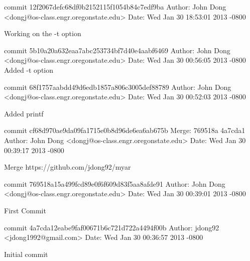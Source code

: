 \documentclass[letterpaper,10pt,titlepage]{article}
\begin{document}
commit 12f2067defc68df0b2152115f1054b84c7edf9ba\newline
Author: John Dong <dongj@os-class.engr.oregonstate.edu>\newline
Date:   Wed Jan 30 18:53:01 2013 -0800\newline

    Working on the -t option\newline

commit 5b10a20a632eaa7abc253734bf7d40e4aabf6469\newline
Author: John Dong <dongj@os-class.engr.oregonstate.edu>\newline
Date:   Wed Jan 30 00:56:05 2013 -0800\newline
\newline
    Added -t option\newline

commit 68f1757aabdd49d6edb1857a806c3005def88789\newline
Author: John Dong <dongj@os-class.engr.oregonstate.edu>\newline
Date:   Wed Jan 30 00:52:03 2013 -0800\newline

    Added printf\newline

commit cf68d970ae9da09fa1715e0b8d96de6ea6ab675b\newline
Merge: 769518a 4a7cda1\newline
Author: John Dong <dongj@os-class.engr.oregonstate.edu>\newline
Date:   Wed Jan 30 00:39:17 2013 -0800\newline

    Merge https://github.com/jdong92/myar\newline

commit 769518a15a499fcd89e0f6f609d83f5aa8afde91\newline
Author: John Dong <dongj@os-class.engr.oregonstate.edu>\newline
Date:   Wed Jan 30 00:39:01 2013 -0800\newline

    First Commit\newline

commit 4a7cda12eabe9faf00671b6c721d722a4494f00b\newline
Author: jdong92 <jdong1992@gmail.com>\newline
Date:   Wed Jan 30 00:36:57 2013 -0800\newline

    Initial commit\newline
\end{document}

